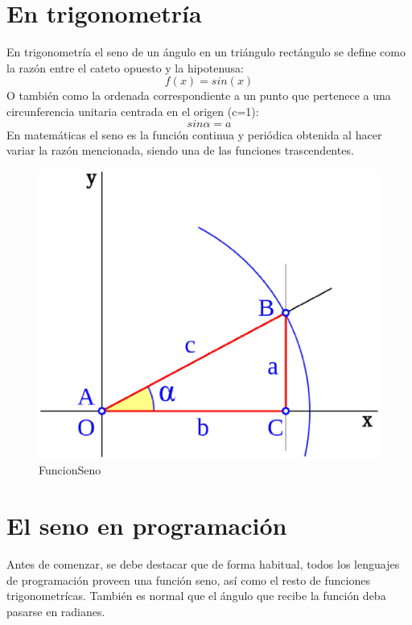 \section{En trigonometría}

\label{1:sec:1}
En trigonometría el seno de un ángulo en un triángulo rectángulo se define como la razón entre
el cateto opuesto y la hipotenusa:\[f(x)=sin(x)\]
O también como la ordenada correspondiente a un punto que pertenece a una circunferencia unitaria
centrada en el origen (c=1):\[sin \alpha =a\]
En matemáticas el seno es la función continua y periódica obtenida al hacer variar la razón mencionada,
siendo una de las funciones trascendentes.
\begin{figure}[H]
\begin{center}
\includegraphics[scale=0.2]{images/seno.eps}
\end{center}
\caption{FuncionSeno}
\label{graph:3}
\end{figure}

\section{El seno en programación}
\label{1:sec:2}

   Antes de comenzar, se debe destacar  que de forma habitual, todos los
lenguajes de programación proveen una función seno, así como el resto de 
funciones trigonometrícas. También es normal  que el ángulo que recibe la
función deba pasarse en radianes.

